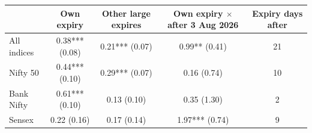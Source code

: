 \begin{tabular}{lcccc}
\toprule
 & Own expiry & Other large expires & Own expiry $\times$ after 3 Aug 2026 & Expiry days after \\
\midrule
All indices & 0.38*** (0.08) & 0.21*** (0.07) & 0.99** (0.41) & 21 \\
Nifty 50 & 0.44*** (0.10) & 0.29*** (0.07) & 0.16 (0.74) & 10 \\
Bank Nifty & 0.61*** (0.10) & 0.13 (0.10) & 0.35 (1.30) & 2 \\
Sensex & 0.22 (0.16) & 0.17 (0.14) & 1.97*** (0.74) & 9 \\
\bottomrule
\end{tabular}